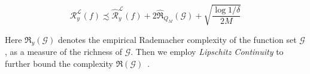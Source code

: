 \begin{small}
\begin{equation}
\label{eq.initial_bound}
\mathcal{R}^{\mathcal{L}}_y(f) \precsim \widehat{\mathcal{R}}^{\mathcal{L}}_y(f) + 2\widehat{\Re}_{Q_M}(\mathcal{G}) + \sqrt{\frac{\log 1/\delta}{2M}} 
\end{equation}
\end{small}
Here ${\Re}_y(\mathcal{G})$ denotes the empirical Rademacher complexity of the function set $\mathcal{G}$, as a measure of the richness of $\mathcal{G}$. 
Then we employ \textit{Lipschitz Continuity} to further bound the complexity ${\Re}(\mathcal{G})$~\cite{cao2019learning}.

